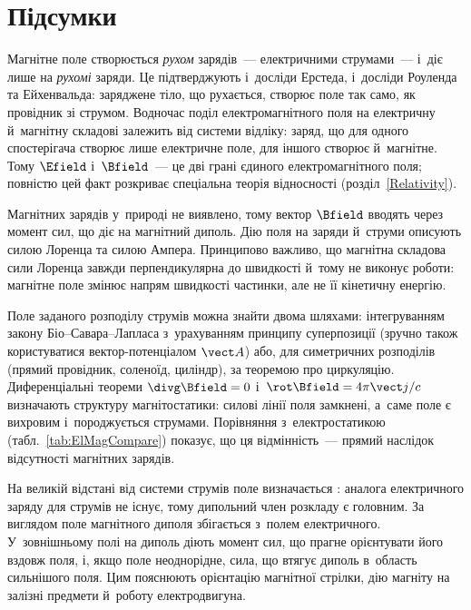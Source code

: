 \section*{Підсумки}


Магнітне поле створюється \emph{рухом} зарядів~--- електричними струмами~--- і~діє лише
на \emph{рухомі} заряди. Це підтверджують і~досліди Ерстеда, і~досліди Роуленда та
Ейхенвальда: заряджене тіло, що рухається, створює поле так само, як провідник зі струмом.
Водночас поділ електромагнітного поля на електричну й~магнітну складові залежить від
системи відліку: заряд, що для одного спостерігача створює лише електричне поле, для
іншого створює й~магнітне. Тому $\Efield$ і~$\Bfield$~--- це дві грані єдиного
електромагнітного поля; повністю цей факт розкриває спеціальна теорія відносності
(розділ~\ref{Relativity}).

Магнітних зарядів у~природі не виявлено, тому вектор $\Bfield$ вводять через момент сил,
що діє на магнітний диполь. Дію поля на заряди й~струми описують силою Лоренца та силою
Ампера. Принципово важливо, що магнітна складова сили Лоренца завжди перпендикулярна до
швидкості й~тому не виконує роботи: магнітне поле змінює напрям швидкості частинки, але не
її кінетичну енергію.

{ Поле заданого розподілу струмів можна знайти двома шляхами: інтегруванням закону
Біо--Савара--Лапласа з~урахуванням принципу суперпозиції (зручно також користуватися
вектор-потенціалом $\vect A$) або, для симетричних розподілів (прямий провідник, соленоїд,
циліндр), за теоремою про циркуляцію. Диференціальні теореми $\divg\Bfield=0$
і~$\rot\Bfield=4\pi\vect j/c$ визначають структуру магнітостатики: силові лінії поля
замкнені, а~саме поле є вихровим і~породжується струмами. Порівняння з~електростатикою
(табл.~\ref{tab:ElMagCompare}) показує, що ця відмінність~--- прямий наслідок відсутності
магнітних зарядів.\par}

На великій відстані від системи струмів поле визначається :
аналога електричного заряду для струмів не існує, тому дипольний член розкладу є головним.
За виглядом поле магнітного диполя збігається з~полем електричного. У~зовнішньому полі на
диполь діють момент сил, що прагне орієнтувати його вздовж поля, і, якщо поле неоднорідне,
сила, що втягує диполь в~область сильнішого поля. Цим пояснюють орієнтацію магнітної
стрілки, дію магніту на залізні предмети й~роботу електродвигуна.

